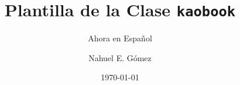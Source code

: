 \titlehead{Plantilla de \LaTeX} 	%
\subject{Para hacer lindos libros}	%

\title[Plantilla de la Clase {\normalfont\texttt{kaobook}}]{Plantilla de la Clase {\normalfont\texttt{kaobook}}}
\subtitle{Ahora en Español}
\author[JBG]{Nahuel E. Gómez}
\date{\today}
\publishers{Un Editor Impresionante}
